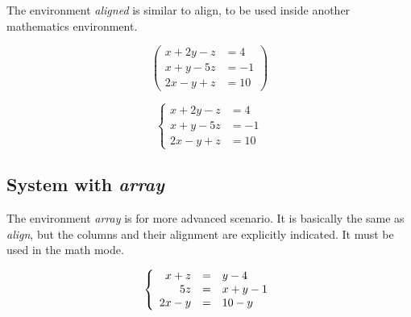 \documentclass{article}
\begin{document}
The environment \emph{aligned} is similar to align, to be used inside another mathematics environment.

\[
\left(
\begin{aligned}
	x + 2y - z &= 4 \\
	x + y - 5z &= -1 \\
	2x - y + z &= 10
\end{aligned}
\right)
\]

\[
\left\{
\begin{aligned}
x + 2y - z &= 4 \\
x + y - 5z &= -1 \\
2x - y + z &= 10
\end{aligned}
\right.
\]

\subsection*{System with \emph{array}}

The environment \emph{array} is for more advanced scenario. It is basically the same as \emph{align}, but the columns and their alignment are explicitly indicated. It must be used in the math mode.

\[
\left\{
\begin{array}{ r c l}
		x + z &=& y - 4 \\
		5z &=& x + y -1 \\
		2x - y &=& 10 - y
\end{array}
\right.
\]
\end{document}
